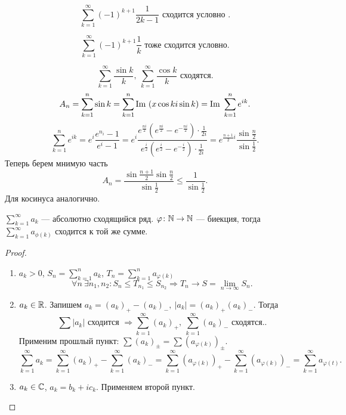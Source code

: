 \begin{ex}
    \[
	\sum_{k=1}^{\infty} (-1)^{k+1}\frac{1}{2k-1} \text{ сходится условно }
    .\] 
\end{ex}
\begin{ex}
    \[
	\sum_{k=1}^{\infty} (-1)^{k+1}\frac{1}{k} \text{ тоже сходится условно}
    .\] 
\end{ex}
\begin{ex}
    \[
	\sum_{k=1}^{\infty} \frac{\sin k}{k}, ~ \sum_{k=1}^{\infty} \frac{\cos k}{k} \text{ сходятся}
    .\] 
    \[
	A_n = \sum_{k=1}^{n}  \sin k= \sum_{k=1}^{n}  {\mathop{\text{\rm Im}}}~ (x\cos k  i \sin k) = {\mathop{\text{\rm Im}}}~ \sum_{k=1}^{n}  e^{ik}
    .\] 
    \[
	\sum_{k=1}^{n}  e^{ik} =  e^{i} \frac{e^{n_i} - 1}{e^{i} - 1}=
e^{i }\frac{e^{\frac{ni}{2}} \left(e^{\frac{ni}{2}}-e^{-\frac{ni}{2}}\right)\cdot \frac{1}{2i}}{e^{\frac{i}{2}}\left(e^{\frac{i}{2}}-e^{-\frac{i}{2}}\right)\cdot \frac{1}{2i}} = e^{\frac{n+1}{2}i} \frac{\sin \frac{n}{2}}{\sin \frac{1}{2}} 
    .\] 
    Теперь берем мнимую часть 
    \[
    A_n  = \frac{\sin \frac{n+1}{2}\sin \frac{n}{2}}{\sin\frac{1}{2}} \le \frac{1}{\sin \frac{1}{2}}
    .\] 
    Для косинуса аналогично.
\end{ex}
\begin{thm}
    $ \sum_{k=1}^{\infty}a_k $ --- абсолютно сходящийся ряд.
    $ \varphi \colon \mathbb{N} \to \mathbb{N}$ --- биекция, тогда $ \sum_{k=1}^{\infty} a_{\phi(k)}$ сходится к той же сумме.
\end{thm}
\begin{proof}

    $ $
    \begin{enumerate}
	\item $ a_k > 0$,  $ S_n = \sum_{k=1}^{n} a_k$, $ T_n = \sum_{k=1}^{n} a_{\varphi(k)}$
	    \[
	    \forall  n ~ \exists  n_1, n_2 \colon S_n \le T_{n_1} \le S_{n_2} \Longrightarrow T_n \to  S = \lim_{n \to \infty} S_n
	    .\] 
	\item $ a_k \in  \mathbb{R}$. Запишем $ a_k = (a_k)_+ - (a_k)_-, ~ \lvert a_k \rvert  = (a_k)_+ (a_k)_-$.
	    Тогда 
	    \[
		\sum{\lvert a_k \rvert }  \text{ сходится } \Longrightarrow   \sum_{k=1}^{\infty} (a_k)_+, ~\sum_{k=1}^{\infty} (a_k)_- \text{ сходятся}.
	    .\] 
	    Применим прошлый пункт: $ \sum{(a_k)_\pm}  = \sum(a_{\varphi(k)})_\pm  $.
	    \[
		\sum_{k=1}^{\infty} a_k = \sum_{k=1}^{\infty}(a_k)_+ - \sum_{k=1}^{\infty} (a_k)_- = \sum_{k=1}^{\infty} (a_{ \varphi (k)})_+ - \sum_{k=1}^{\infty} (a_{ \varphi (k)})_- = \sum_{k=1}^{\infty}  a_{ \varphi (t)}  
	    .\] 
	\item $ a_k \in \mathbb{C}$, $ a_ k= b_k + i c_k$. Применяем второй пункт.
    \end{enumerate}
\end{proof}
